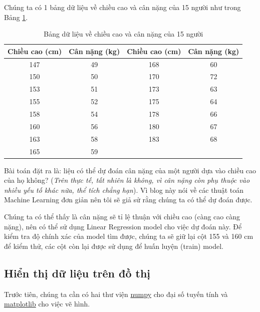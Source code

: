 Chúng ta có 1 bảng dữ liệu về chiều cao và cân nặng của 15 người như trong Bảng \ref{tab:height_weight}. 
 
 
\begin{table}[h!]
\centering
\caption{Bảng dữ liệu về chiều cao và cân nặng của 15 người}
\label{tab:height_weight}
\begin{tabular}{|c|c|c|c|}
\hline
\textbf{Chiều cao (cm)} & \textbf{Cân nặng (kg)} & \textbf{Chiều cao (cm)} & \textbf{Cân nặng (kg)} \\ \hline
147                     & 49                     & 168                     & 60                     \\ \hline
150                     & 50                     & 170                     & 72                     \\ \hline
153                     & 51                     & 173                     & 63                     \\ \hline
155                     & 52                     & 175                     & 64                     \\ \hline
158                     & 54                     & 178                     & 66                     \\ \hline
160                     & 56                     & 180                     & 67                     \\ \hline
163                     & 58                     & 183                     & 68                     \\ \hline
165                     & 59                     &                         &                        \\ \hline
\end{tabular}
\end{table}

Bài toán đặt ra là: liệu có thể dự đoán cân nặng của một người dựa vào chiều cao của họ không? (\textit{Trên thực tế, tất nhiên là không, vì cân nặng còn phụ thuộc vào nhiều yếu tố khác nữa, thể tích chẳng hạn}). Vì blog này nói về các thuật toán Machine Learning đơn giản nên tôi sẽ giả sử rằng chúng ta có thể dự đoán được. 
 
Chúng ta có thể thấy là cân nặng sẽ tỉ lệ thuận với chiều cao (càng cao càng nặng), nên có thể sử dụng Linear Regression model cho việc dự đoán này. Để kiểm tra độ chính xác của model tìm được, chúng ta sẽ giữ lại cột 155 và 160 cm để kiểm thử, các cột còn lại được sử dụng để huấn luyện (train) model. 
 
 
\subsection{Hiển thị dữ liệu trên đồ thị}
Trước tiên, chúng ta cần có hai thư viện \href{http://www.numpy.org/}{numpy} cho đại số tuyến tính và \href{http://matplotlib.org/}{matplotlib} cho việc vẽ hình.  
 
